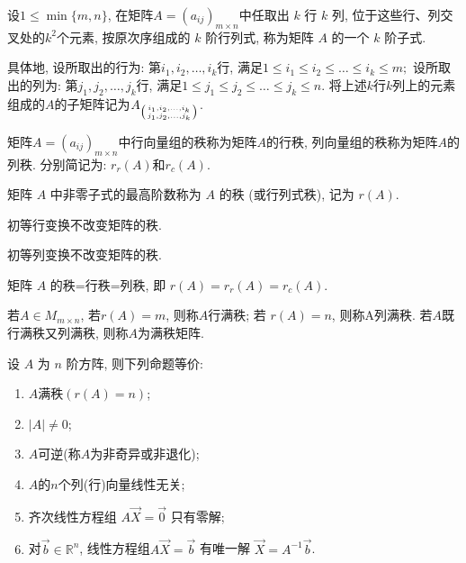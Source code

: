 \begin{Def}
设$1\leq \min\{m,n\}$, 在矩阵$A=(a_{ij})_{m\times n}$中任取出 $k$ 行 $k$ 列, 位于这些行、列交叉处的$k^2$个元素, 按原次序组成的 $k$ 阶行列式, 称为矩阵 $A$ 的一个 $k$ 阶子式.

具体地, 设所取出的行为: 第$i_1,i_2,\dots,i_k$行, 满足$1\leq i_1\leq i_2\leq \dots\leq i_k\leq m;$ 设所取出的列为: 第$j_1,j_2,\dots,j_k$行, 满足$1\leq j_1\leq j_2\leq \dots\leq j_k\leq n.$ 将上述$k$行$k$列上的元素组成的$A$的子矩阵记为$A_{\left( i_1,i_2,\dots,i_k \atop j_1,j_2,\dots,j_k  \right)}$.
\end{Def}

\begin{Def}
矩阵$A=(a_{ij})_{m\times n}$中行向量组的秩称为矩阵$A$的行秩, 列向量组的秩称为矩阵$A$的列秩. 分别简记为: $r_r(A)$和$r_c(A)$.

\end{Def}

\begin{Def}
矩阵 $A$ 中非零子式的最高阶数称为 $A$ 的秩 (或行列式秩),  记为 $r(A)$.
\end{Def}

\begin{thm}
初等行变换不改变矩阵的秩.
\end{thm}

\begin{thm}
初等列变换不改变矩阵的秩.
\end{thm}

\begin{thm}
矩阵 $A$ 的秩=行秩=列秩, 即 $r(A) =r_r(A) =r_c(A)$.

\end{thm}

\begin{Def}
若$A\in M_{m\times n}$, 若$r(A)=m$, 则称$A$行满秩; 若 $r(A) = n$, 则称A列满秩. 若$A$既行满秩又列满秩, 则称$A$为满秩矩阵.

\end{Def}


\begin{thm}
设 $A$ 为 $n$ 阶方阵, 则下列命题等价:
\begin{enumerate}
\item $A$满秩$(r(A)=n)$;
\item $|A|\not=0$;
\item $A$可逆(称$A$为非奇异或非退化);
\item $A$的$n$个列(行)向量线性无关;
\item 齐次线性方程组 $A\vec{X}=\vec{0}$ 只有零解;
\item 对$\vec{b}\in \mathbb{R}^n$, 线性方程组$A\vec{X}=\vec{b}$ 有唯一解 $\vec{X}=A^{-1}\vec{b}$.
\end{enumerate}

\end{thm}

